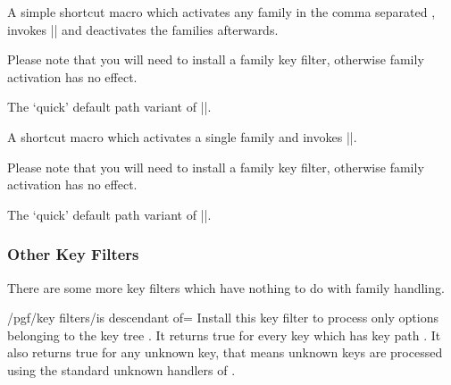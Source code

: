 \begin{command}{\pgfkeysactivatefamiliesandfilteroptions{}}%
	A simple shortcut macro which activates any family in the comma separated , invokes |\pgfkeysfiltered| and deactivates the families afterwards.

	Please note that you will need to install a family key filter, otherwise family activation has no effect.
\end{command}
\begin{command}{\pgfqkeysactivatefamiliesandfilteroptions{}}%
	The `quick' default path variant of |\pgfkeysactivatefamiliesandfilteroptions|.
\end{command}

\begin{command}{\pgfkeysactivatesinglefamilyandfilteroptions{}}%
	A shortcut macro which activates a single family and invokes |\pgfkeysfiltered|.

	Please note that you will need to install a family key filter, otherwise family activation has no effect.
\end{command}
\begin{command}{\pgfqkeysactivatesinglefamilyandfilteroptions{}}%
	The `quick' default path variant of |\pgfkeysactivatesinglefamilyandfilteroptions|.
\end{command}

\subsubsection{Other Key Filters}
There are some more key filters which have nothing to do with family handling.
\begin{key}{/pgf/key filters/is descendant of=}
	Install this key filter to process only options belonging to the key tree . It returns true for every key which has key path . It also returns true for any unknown key, that means unknown keys are processed using the standard unknown handlers of \pgfname.
\begin{codeexample}[]
\end{codeexample}
\end{key}

